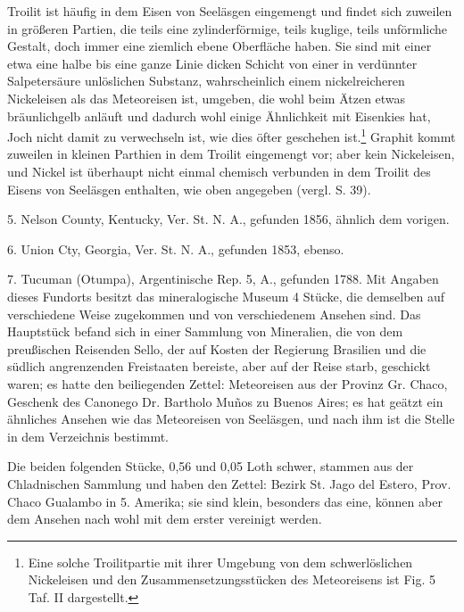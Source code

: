 \documentclass[a4paper, 11pt, oneside]{article}
\begin{document}
Troilit ist häufig in dem Eisen von Seeläsgen eingemengt und findet sich zuweilen in größeren Partien, die teils eine zylinderförmige, teils kuglige, teils unförmliche Gestalt, doch immer eine ziemlich ebene Oberfläche haben. Sie sind mit einer etwa eine halbe bis eine ganze Linie dicken Schicht von einer in verdünnter Salpetersäure unlöslichen Substanz, wahrscheinlich einem nickelreicheren Nickeleisen als das Meteoreisen ist, umgeben, die wohl beim Ätzen etwas bräunlichgelb anläuft und dadurch wohl einige Ähnlichkeit mit Eisenkies hat, Joch nicht damit zu verwechseln ist, wie dies öfter geschehen ist.\footnote{Eine solche Troilitpartie mit ihrer Umgebung von dem schwerlöslichen Nickeleisen und den Zusammensetzungsstücken des Meteoreisens ist Fig. 5 Taf. II dargestellt.} Graphit kommt zuweilen in kleinen Parthien in dem Troilit eingemengt vor; aber kein Nickeleisen, und Nickel ist überhaupt nicht einmal chemisch verbunden in dem Troilit des Eisens von Seeläsgen enthalten, wie oben angegeben (vergl. S. 39).

5. Nelson County, Kentucky, Ver. St. N. A., gefunden 1856, ähnlich dem vorigen.

6. Union Cty, Georgia, Ver. St. N. A., gefunden 1853, ebenso.

7. Tucuman (Otumpa), Argentinische Rep. 5, A., gefunden 1788. Mit Angaben dieses Fundorts besitzt das mineralogische Museum 4 Stücke, die demselben auf verschiedene Weise zugekommen und von verschiedenem Ansehen sind. Das Hauptstück befand sich in einer Sammlung von Mineralien, die von dem preußischen Reisenden Sello, der auf Kosten der Regierung Brasilien und die südlich angrenzenden Freistaaten bereiste, aber auf der Reise starb, geschickt waren; es hatte den beiliegenden Zettel: Meteoreisen aus der Provinz Gr. Chaco, Geschenk des Canonego Dr. Bartholo Muños zu Buenos Aires; es hat geätzt ein ähnliches Ansehen wie das Meteoreisen von Seeläsgen, und nach ihm ist die Stelle in dem Verzeichnis bestimmt.

Die beiden folgenden Stücke, 0,56 und 0,05 Loth schwer, stammen aus der Chladnischen Sammlung und haben den Zettel: Bezirk St. Jago del Estero, Prov. Chaco Gualambo in 5. Amerika; sie sind klein, besonders das eine, können aber dem Ansehen nach wohl mit dem erster vereinigt werden.
\end{document}
